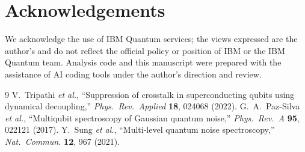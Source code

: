 \documentclass[10pt,twocolumn]{article}
\begin{document}
\section*{Acknowledgements}
We acknowledge the use of IBM Quantum services; the views expressed are the author's and do not
reflect the official policy or position of IBM or the IBM Quantum team. Analysis code and this
manuscript were prepared with the assistance of AI coding tools under the author's direction and
review.

\begin{thebibliography}{9}\small
{} V.~Tripathi \emph{et al.}, ``Suppression of crosstalk in superconducting qubits
using dynamical decoupling,'' \emph{Phys.\ Rev.\ Applied} \textbf{18}, 024068 (2022).
 G.~A.~Paz-Silva \emph{et al.}, ``Multiqubit spectroscopy of Gaussian quantum noise,''
\emph{Phys.\ Rev.\ A} \textbf{95}, 022121 (2017).
 Y.~Sung \emph{et al.}, ``Multi-level quantum noise spectroscopy,''
\emph{Nat.\ Commun.} \textbf{12}, 967 (2021).
\end{thebibliography}
\end{document}
